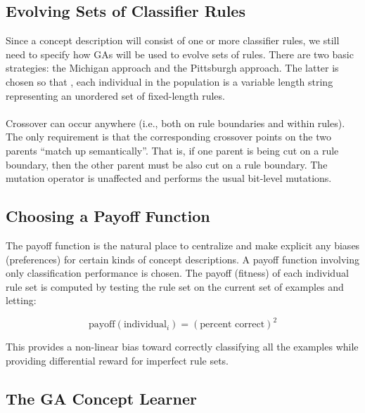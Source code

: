 \documentclass[../main.tex]{subfiles}
\begin{document}
\subsection{Evolving Sets of Classifier Rules}
Since a concept description will consist of one or more classifier rules, we still need to specify how GAs will be used
to evolve sets of rules. There are two basic strategies: the Michigan approach and the Pittsburgh approach. The latter
is chosen so that , each individual in the population is a variable length string representing an unordered set of
fixed-length rules.
\\\\
Crossover can occur anywhere (i.e., both on rule boundaries and within rules). The only requirement is that the
corresponding crossover points on the two parents ``match up semantically''. That is, if one parent is being cut on a
rule boundary, then the other parent must be also cut on a rule boundary. The mutation operator is unaffected and
performs the usual bit-level mutations.

\subsection{Choosing a Payoff Function}
The payoff function is the natural place to centralize and make explicit any biases (preferences) for certain kinds of
concept descriptions. A payoff function involving only classification performance is chosen. The payoff (fitness) of
each individual rule set is computed by testing the rule set on the current set of examples and letting:

\begin{equation}
	\text{payoff}(\text{individual}_i) = (\text{percent correct})^2
\end{equation}

This provides a non-linear bias toward correctly classifying all the examples while providing differential reward for
imperfect rule sets.

\subsection{The GA Concept Learner}
\end{document}
